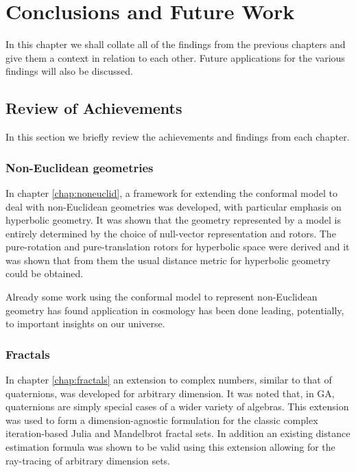 \chapter{Conclusions and Future Work}

In this chapter we shall collate all of the findings from the previous chapters
and give them a context in relation to each other. Future applications for
the various findings will also be discussed.

\section{Review of Achievements}

In this section we briefly review the achievements and findings from each
chapter.

\subsection{Non-Euclidean geometries}

In chapter \ref{chap:noneuclid}, a framework for extending the conformal
model to deal with non-Euclidean geometries was developed, with particular
emphasis on hyperbolic geometry. It was shown that the geometry
represented by a model is entirely determined by the choice of null-vector
representation and rotors. The pure-rotation and pure-translation 
rotors for hyperbolic space were derived and it was shown that from them the usual
distance metric for hyperbolic geometry could be obtained.

Already some work using the conformal model to represent non-Euclidean geometry
has found application in cosmology\cite{GA:SIGKEY} has been done leading, potentially, to important insights on
our universe.

\subsection{Fractals}

In chapter \ref{chap:fractals} an extension to complex numbers, similar to that
of quaternions, was developed for arbitrary dimension. It was noted that, in
GA, quaternions are simply special cases of a wider variety of algebras. This
extension was used to form a dimension-agnostic formulation for the classic
complex iteration-based Julia and Mandelbrot fractal sets. In addition an
existing distance estimation formula was shown to be valid using this extension
allowing for the ray-tracing of arbitrary dimension sets.

